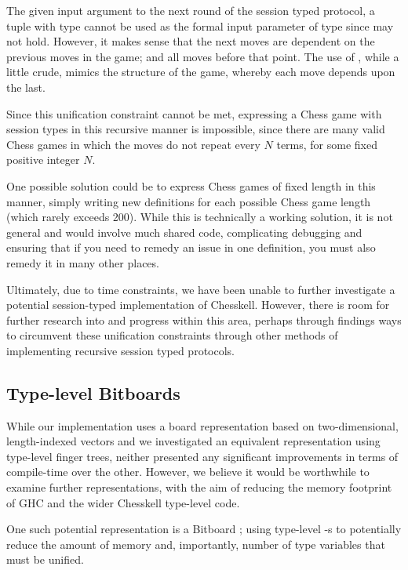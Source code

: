 The given input argument to the next round of the session typed protocol, a tuple with type  cannot be used as the formal input parameter of type  since  may not hold. However, it makes sense that the next moves are dependent on the previous moves in the game; and all moves before that point. The use of , while a little crude, mimics the structure of the game, whereby each move depends upon the last.

Since this unification constraint cannot be met, expressing a Chess game with session types in this recursive manner is impossible, since there are many valid Chess games in which the moves do not repeat every $N$ terms, for some fixed positive integer $N$.

One possible solution could be to express Chess games of fixed length in this manner, simply writing new definitions for each possible Chess game length (which rarely exceeds 200). While this is technically a working solution, it is not general and would involve much shared code, complicating debugging and ensuring that if you need to remedy an issue in one definition, you must also remedy it in many other places.

Ultimately, due to time constraints, we have been unable to further investigate a potential session-typed implementation of Chesskell. However, there is room for further research into and progress within this area, perhaps through findings ways to circumvent these unification constraints through other methods of implementing recursive session typed protocols.


\subsection{Type-level Bitboards}

While our implementation uses a board representation based on two-dimensional, length-indexed vectors and we investigated an equivalent representation using type-level finger trees, neither presented any significant improvements in terms of compile-time over the other. However, we believe it would be worthwhile to examine further representations, with the aim of reducing the memory footprint of GHC and the wider Chesskell type-level code.

One such potential representation is a Bitboard \cite{bitboard}; using type-level -s to potentially reduce the amount of memory and, importantly, number of type variables that must be unified.


